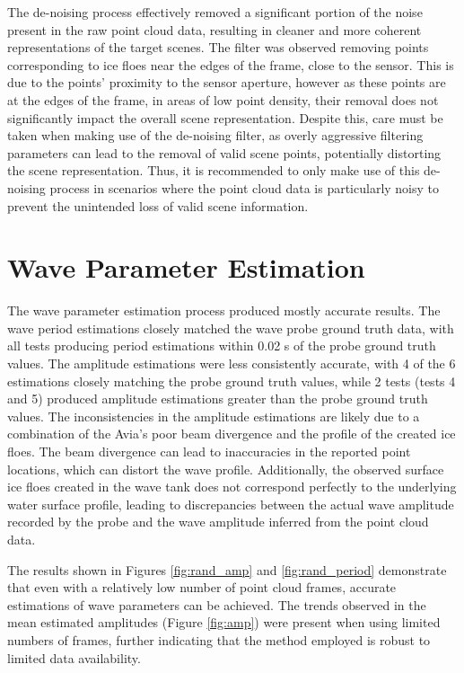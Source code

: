 The de-noising process effectively removed a significant portion of the noise present in the raw point cloud data, resulting in cleaner and more coherent representations of the target scenes. The filter was observed removing points corresponding to ice floes near the edges of the frame, close to the sensor. This is due to the points' proximity to the sensor aperture, however as these points are at the edges of the frame, in areas of low point density, their removal does not significantly impact the overall scene representation. Despite this, care must be taken when making use of the de-noising filter, as overly aggressive filtering parameters can lead to the removal of valid scene points, potentially distorting the scene representation. Thus, it is recommended to only make use of this de-noising process in scenarios where the point cloud data is particularly noisy to prevent the unintended loss of valid scene information.

\section{Wave Parameter Estimation}
\label{sec:ch8.section3}

The wave parameter estimation process produced mostly accurate results. The wave period estimations closely matched the wave probe ground truth data, with all tests producing period estimations within 0.02 s of the probe ground truth values. The amplitude estimations were less consistently accurate, with 4 of the 6 estimations closely matching the probe ground truth values, while 2 tests (tests 4 and 5) produced amplitude estimations greater than the probe ground truth values. The inconsistencies in the amplitude estimations are likely due to a combination of the Avia's poor beam divergence and the profile of the created ice floes. The beam divergence can lead to inaccuracies in the reported point locations, which can distort the wave profile. Additionally, the observed surface ice floes created in the wave tank does not correspond perfectly to the underlying water surface profile, leading to discrepancies between the actual wave amplitude recorded by the probe and the wave amplitude inferred from the point cloud data.

The results shown in Figures \ref{fig:rand_amp} and \ref{fig:rand_period} demonstrate that even with a relatively low number of point cloud frames, accurate estimations of wave parameters can be achieved. The trends observed in the mean estimated amplitudes (Figure \ref{fig:amp}) were present when using limited numbers of frames, further indicating that the method employed is robust to limited data availability.

